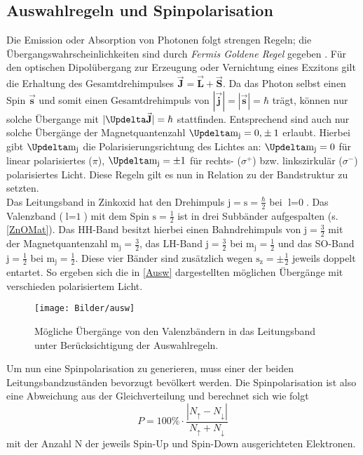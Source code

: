 \subsection{Auswahlregeln und Spinpolarisation}
\label{AusR}
Die Emission oder Absorption von Photonen folgt strengen Regeln; die Übergangswahrscheinlichkeiten sind durch \textit{Fermis Goldene Regel} gegeben \cite{Dirac.1927}. Für den optischen Dipolübergang zur Erzeugung oder Vernichtung eines Exzitons gilt die Erhaltung des Gesamtdrehimpulses $\vec{\textbf{J}}=\vec{\textbf{L}}+\vec{\textbf{S}}$. Da das Photon selbst einen Spin $\vec{\textbf{s}}$ und somit einen Gesamtdrehimpuls von $|\vec{\textbf{j}}|=|\vec{\textbf{s}}|=\hbar$ trägt, können nur solche Übergange mit $|\Updelta \vec{\textbf{J}}|=\hbar$ stattfinden. Entsprechend sind auch nur solche Übergänge der Magnetquantenzahl $\Updelta \text{m}_\text{j}=\text{0,}\pm \text{1}$ erlaubt. Hierbei gibt $\Updelta\text{m}_\text{j}$ die Polarisierungsrichtung des Lichtes an: $\Updelta\text{m}_\text{j}=\text{0}$ für linear polarisiertes ($\pi$), $\Updelta\text{m}_\text{j}=\pm\text{1}$ für rechts- ($\sigma^{+}$) bzw. linkszirkulär ($\sigma^{-}$) polarisiertes Licht. Diese Regeln gilt es nun in Relation zu der Bandstruktur zu setzten.\\
Das Leitungsband in Zinkoxid hat den Drehimpuls $\text{j}=\text{s}=\frac{\hbar}{\text{2}}$ bei $\text{l}=\text{0}$. Das Valenzband ($\text{l}=\text{1}$) mit dem Spin $\text{s}=\frac{1}{2}$
ist in drei Subbänder aufgespalten (s. \autoref{ZnOMat}). Das HH-Band besitzt hierbei einen Bahndrehimpuls von $\text{j}=\frac{3}{2}$ mit der Magnetquantenzahl $\text{m}_\text{j}=\frac{3}{2}$, das LH-Band $\text{j}=\frac{3}{2}$ bei $\text{m}_\text{j}=\frac{1}{2}$ und das SO-Band $\text{j}=\frac{1}{2}$ bei $\text{m}_\text{j}=\frac{1}{2}$. Diese vier Bänder sind zusätzlich wegen $\text{s}_\text{z}=\pm\frac{1}{2}$ jeweils doppelt entartet. So ergeben sich die in \autoref{Ausw} dargestellten möglichen Übergänge mit verschieden polarisiertem Licht.
\begin{figure}[h]
\centering
\texttt{[image: Bilder/ausw]}
\caption[Auswahlregeln]{Mögliche Übergänge von den Valenzbändern in das Leitungsband unter Berücksichtigung der Auswahlregeln.}
\label{Ausw}
\end{figure}
Um nun eine Spinpolarisation zu generieren, muss einer der beiden Leitungsbandzuständen bevorzugt bevölkert werden. Die Spinpolarisation ist also eine Abweichung aus der Gleichverteilung und berechnet sich wie folgt
\begin{equation}
P=100\%\cdot \frac{\left| N_\uparrow- N_\downarrow\right|}{N_\uparrow+ N_\downarrow}
\end{equation}
mit der Anzahl N der jeweils Spin-Up und Spin-Down ausgerichteten  Elektronen.
